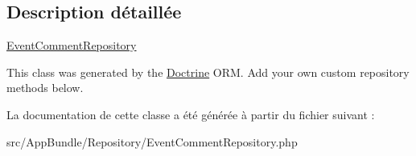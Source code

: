 \subsection{Description détaillée}
\hyperlink{classAppBundle_1_1Repository_1_1EventCommentRepository}{Event\+Comment\+Repository}

This class was generated by the \hyperlink{namespaceAppBundle_1_1Doctrine}{Doctrine} O\+RM. Add your own custom repository methods below. 

La documentation de cette classe a été générée à partir du fichier suivant \+:\begin{DoxyCompactItemize}
\item 
src/\+App\+Bundle/\+Repository/Event\+Comment\+Repository.\+php\end{DoxyCompactItemize}
